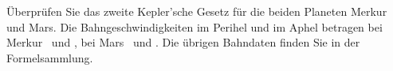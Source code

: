 Überprüfen Sie das zweite Kepler'sche Gesetz für die beiden Planeten Merkur und Mars. Die Bahngeschwindigkeiten im Perihel und im Aphel betragen bei Merkur \vPMeO\ und \vAMeO, bei Mars \vPMaO\ und \vAMaO. Die übrigen Bahndaten finden Sie in der Formelsammlung.
